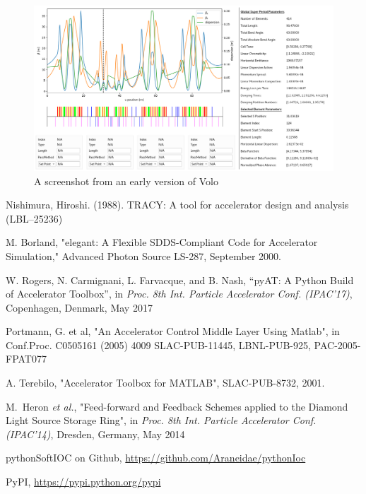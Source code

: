 \documentclass[a4paper,
               keeplastbox,   %
               ]{jacow}
\begin{document}
\begin{figure}[!hbt]
    \centering
    \includegraphics*[width=\columnwidth]{MOPHA017f2}
    \caption{A screenshot from an early version of Volo}
    \label{fig:volo}
\end{figure}

\begin{thebibliography}{9}                                                      
                  
    Nishimura, Hiroshi. (1988). TRACY: A tool for accelerator design and analysis (LBL--25236)

    M. Borland, "elegant: A Flexible SDDS-Compliant Code for Accelerator Simulation," Advanced Photon Source LS-287, September 2000.
      
    W. Rogers, N. Carmignani, L. Farvacque, and B. Nash,
    \textquotedblleft{pyAT: A Python Build of Accelerator Toolbox}\textquotedblright,
    in \emph{Proc. 8th Int. Particle Accelerator Conf. (IPAC'17)}, 
    Copenhagen, Denmark, May 2017

     Portmann, G. et al, "An Accelerator Control Middle Layer Using Matlab", 
     in Conf.Proc. C0505161 (2005) 4009 SLAC-PUB-11445, LBNL-PUB-925, PAC-2005-FPAT077 
     
    A. Terebilo, "Accelerator Toolbox for MATLAB", SLAC-PUB-8732, 2001.   
    
  M.~Heron {\it et al.},
  "Feed-forward and Feedback Schemes applied to the Diamond Light Source Storage Ring",
      in \emph{Proc. 8th Int. Particle Accelerator Conf. (IPAC'14)}, 
    Dresden, Germany, May 2014

    pythonSoftIOC on Github, \url{https://github.com/Araneidae/pythonIoc} 
    
    PyPI, \url{https://pypi.python.org/pypi} 
                                                  
\end{thebibliography}                                                 
\end{document}
